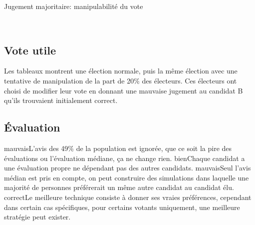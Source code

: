\documentclass[../report]{subfiles}
\begin{document}
  \begin{table}[H]
    \begin{center}
      \caption{Jugement majoritaire: manipulabilité du vote}%
      \label{fig:diff:jugmaj:caslim1}
      \\[1em]
    \end{center}
  \end{table}
  \subsection{Vote utile}

  Les tableaux  montrent une élection normale, puis la même élection avec une tentative
  de manipulation de la part de 20\% des électeurs. 
  Ces électeurs ont choisi de modifier leur vote en donnant une mauvaise jugement au candidat B qu'ils trouvaient 
  initialement correct.

  \subsection{Évaluation}
  \tabcritere%
    {mauvais}{L'avis des 49\% de la population est ignorée, que ce soit la pire des évaluations ou l'évaluation médiane, ça ne change rien.}%
    {bien}{Chaque candidat a une évaluation propre ne dépendant pas des autres candidats.}%
    {mauvais}{Seul l'avis médian est pris en compte, on peut construire des simulations dans laquelle une majorité de personnes préférerait un même autre candidat au candidat élu.}%
    {correct}{Le meilleure technique consiste à donner ses vraies préférences, cependant dans certain cas spécifiques, pour certains votants uniquement, une meilleure stratégie peut exister.}
\end{document}
